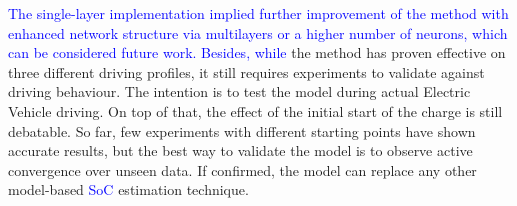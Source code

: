 %
%
\textcolor{blue}{
The single-layer implementation implied further improvement of the method with enhanced network structure via multilayers or a higher number of neurons, which can be considered future work.
Besides, while} the method has proven effective on three different driving profiles, it still requires experiments to validate against driving behaviour.
The intention is to test the model during actual Electric Vehicle driving.
On top of that, the effect of the initial start of the charge is still debatable.
So far, few experiments with different starting points have shown accurate results, but the best way to validate the model is to observe active convergence over unseen data.
If confirmed, the model can replace any other model-based \textcolor{blue}{SoC} estimation technique.
